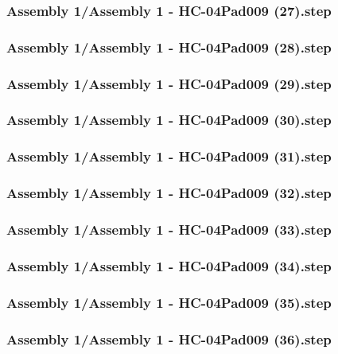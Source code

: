 \documentclass[a4paper,12pt]{article}
\begin{document}
\begin{lstlising}[language=C++]
\subsubsection{Assembly 1/Assembly 1 - HC-04Pad009 (27).step}

\subsubsection{Assembly 1/Assembly 1 - HC-04Pad009 (28).step}

\subsubsection{Assembly 1/Assembly 1 - HC-04Pad009 (29).step}

\subsubsection{Assembly 1/Assembly 1 - HC-04Pad009 (30).step}

\subsubsection{Assembly 1/Assembly 1 - HC-04Pad009 (31).step}

\subsubsection{Assembly 1/Assembly 1 - HC-04Pad009 (32).step}

\subsubsection{Assembly 1/Assembly 1 - HC-04Pad009 (33).step}

\subsubsection{Assembly 1/Assembly 1 - HC-04Pad009 (34).step}

\subsubsection{Assembly 1/Assembly 1 - HC-04Pad009 (35).step}

\subsubsection{Assembly 1/Assembly 1 - HC-04Pad009 (36).step}


\end{lstlising}
\end{document}
